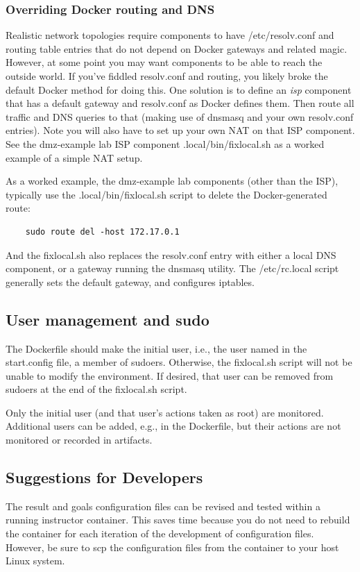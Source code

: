 \documentclass[12pt]{article}
\begin{document}
\subsubsection{Overriding Docker routing and DNS}
Realistic network topologies require components to have /etc/resolv.conf and routing
table entries that do not depend on Docker gateways and related magic.  However, at some point you may
want components to be able to reach the outside world.  If you've fiddled resolv.conf and routing,
you likely broke the default Docker method for doing this.  One solution is to 
define an \textit{isp} component that has a default gateway and resolv.conf as Docker defines them.  Then
route all traffic and DNS queries to that (making use of dnsmasq and your own resolv.conf entries).  
Note you will also have to set up your own NAT on that ISP component.  See the dmz-example lab
ISP component .local/bin/fixlocal.sh as a worked example of a simple NAT setup.

As a worked example, the dmz-example lab components (other than the ISP), typically use the .local/bin/fixlocal.sh script to 
delete the Docker-generated route:
\begin{verbatim}
    sudo route del -host 172.17.0.1
\end{verbatim}
\noindent And the fixlocal.sh also replaces the resolv.conf entry with either a local DNS component, or a gateway running
the dnsmasq utility.  The /etc/rc.local script generally sets the default gateway, and configures iptables.

\subsection{User management and sudo}
The Dockerfile should make the initial user, i.e., the user named in the start.config file, a member of sudoers.
Otherwise, the fixlocal.sh script will not be unable to modify the environment.  If desired, that user can be
removed from sudoers at the end of the fixlocal.sh script.

Only the initial user (and that user's actions taken as root) are monitored.  Additional users can be added,
e.g., in the Dockerfile, but their actions are not monitored or recorded in artifacts.


\subsection{Suggestions for Developers}
The result and goals configuration files can be revised and tested within a
running instructor container.  This saves time because you do not need to rebuild
the container for each iteration of the development of configuration files.  However,
be sure to scp the configuration files from the container to your host Linux system.
\end{document}
